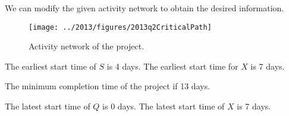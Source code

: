 %
%

\begin{subquestions}


\subquestion

We can modify the given activity network to obtain the desired information.
\begin{figure}[H]
	\begin{center}
		\texttt{[image: ../2013/figures/2013q2CriticalPath]}
		\caption{\label{2013:q2:fig:ActNet} Activity network of the project.}
	\end{center}
\end{figure}




\begin{subsubquestions}

\subsubquestion 

The earliest start time of $S$ is 4 days. The earliest start time for $X$ is 7 days.


\subsubquestion

The minimum completion time of the project if 13 days.


\subsubquestion

The latest start time of $Q$ is 0 days. The latest start time of $X$ is 7 days.


\subsubquestion


\end{subsubquestions}
\end{subquestions}
